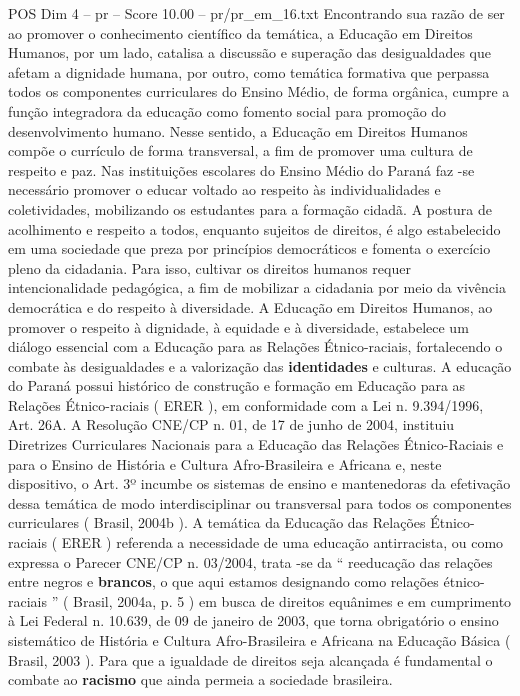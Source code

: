 \begin{textsample}{POS Dim 4 – pr – Score 10.00 – pr/pr\_em\_16.txt}
Encontrando sua razão de ser ao promover o conhecimento científico da temática, a Educação em Direitos Humanos, por um lado, catalisa a discussão e superação das desigualdades que afetam a dignidade humana, por outro, como temática formativa que perpassa todos os componentes curriculares do Ensino Médio, de forma orgânica, cumpre a função integradora da educação como fomento social para promoção do desenvolvimento humano.
Nesse sentido, a Educação em Direitos Humanos compõe o currículo de forma transversal, a fim de promover uma cultura de respeito e paz.
Nas instituições escolares do Ensino Médio do Paraná faz -se necessário promover o educar voltado ao respeito às individualidades e coletividades, mobilizando os estudantes para a formação cidadã.
A postura de acolhimento e respeito a todos, enquanto sujeitos de direitos, é algo estabelecido em uma sociedade que preza por princípios democráticos e fomenta o exercício pleno da cidadania.
Para isso, cultivar os direitos humanos requer intencionalidade pedagógica, a fim de mobilizar a cidadania por meio da vivência democrática e do respeito à diversidade.
A Educação em Direitos Humanos, ao promover o respeito à dignidade, à equidade e à diversidade, estabelece um diálogo essencial com a Educação para as Relações Étnico-raciais, fortalecendo o combate às desigualdades e a valorização das \textbf{identidades} e culturas.
A educação do Paraná possui histórico de construção e formação em Educação para as Relações Étnico-raciais ( ERER ), em conformidade com a Lei n. 9.394/1996, Art. 26A.
A Resolução CNE/CP n. 01, de 17 de junho de 2004, instituiu Diretrizes Curriculares Nacionais para a Educação das Relações Étnico-Raciais e para o Ensino de História e Cultura Afro-Brasileira e Africana e, neste dispositivo, o Art. 3º incumbe os sistemas de ensino e mantenedoras da efetivação dessa temática de modo interdisciplinar ou transversal para todos os componentes curriculares ( Brasil, 2004b ).
A temática da Educação das Relações Étnico-raciais ( ERER ) referenda a necessidade de uma educação antirracista, ou como expressa o Parecer CNE/CP n. 03/2004, trata -se da “ reeducação das relações entre negros e \textbf{brancos}, o que aqui estamos designando como relações étnico-raciais ” ( Brasil, 2004a, p. 5 ) em busca de direitos equânimes e em cumprimento à Lei Federal n. 10.639, de 09 de janeiro de 2003, que torna obrigatório o ensino sistemático de História e Cultura Afro-Brasileira e Africana na Educação Básica ( Brasil, 2003 ).
Para que a igualdade de direitos seja alcançada é fundamental o combate ao \textbf{racismo} que ainda permeia a sociedade brasileira.

\end{textsample}
